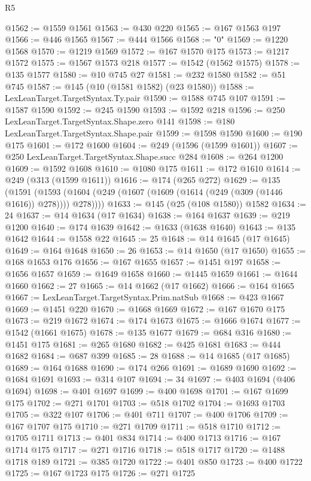 \begin{lexlean}{R5}
\begin{coremodule}
{{{{{{{{{{{{{{{{{{{{{{{{{{{{{{{{{{{{{{{{{{{{{{{{{{{{{{{{{{{{{{@1562 := @1559 @1561
@1563 := @430 @220
@1565 := @167 @1563 @197
@1566 := @446 @1565
@1567 := @444 @1566
@1568 := "0"
@1569 := @1220 @1568
@1570 := @1219 @1569
@1572 := @167 @1570 @175
@1573 := @1217 @1572
@1575 := @1567 @1573 @218
@1577 := @1542 (@1562 @1575)
@1578 := @135 @1577
@1580 := @10 @745 @27
@1581 := @232 @1580
@1582 := @51 @745
@1587 := @145 (@10 (@1581 @1582) (@23 @1580))
@1588 := LexLeanTarget.TargetSyntax.Ty.pair
@1590 := @1588 @745 @107
@1591 := @1587 @1590
@1592 := @245 @1590
@1593 := @1592 @218
@1596 := @250 LexLeanTarget.TargetSyntax.Shape.zero @141
@1598 := @180 LexLeanTarget.TargetSyntax.Shape.pair
@1599 := @1598 @1590
@1600 := @190 @175
@1601 := @172 @1600
@1604 := @249 (@1596 (@1599 @1601))
@1607 := @250 LexLeanTarget.TargetSyntax.Shape.succ @284
@1608 := @264 @1200
@1609 := @1592 @1608
@1610 := @1080 @175
@1611 := @172 @1610
@1614 := @249 (@313 (@1599 @1611))
@1616 := @174 (@265 @272)
@1629 := @135
    (@1591 (@1593 (@1604 (@249 (@1607 (@1609 (@1614 (@249 (@309 (@1446 @1616)) @278)))) @278))))
@1633 := @145 (@25 (@108 @1580)) @1582
@1634 := 24
@1637 := @14 @1634 (@17 @1634)
@1638 := @164 @1637
@1639 := @219 @1200
@1640 := @174 @1639
@1642 := @1633 (@1638 @1640)
@1643 := @135 @1642
@1644 := @1558 @22
@1645 := 25
@1648 := @14 @1645 (@17 @1645)
@1649 := @164 @1648
@1650 := 26
@1653 := @14 @1650 (@17 @1650)
@1655 := @168 @1653 @176
@1656 := @167 @1655
@1657 := @1451 @197
@1658 := @1656 @1657
@1659 := @1649 @1658
@1660 := @1445 @1659
@1661 := @1644 @1660
@1662 := 27
@1665 := @14 @1662 (@17 @1662)
@1666 := @164 @1665
@1667 := LexLeanTarget.TargetSyntax.Prim.natSub
@1668 := @423 @1667
@1669 := @1451 @220
@1670 := @1668 @1669
@1672 := @167 @1670 @175
@1673 := @219 @1672
@1674 := @174 @1673
@1675 := @1666 @1674
@1677 := @1542 (@1661 @1675)
@1678 := @135 @1677
@1679 := @684 @316
@1680 := @1451 @175
@1681 := @265 @1680
@1682 := @425 @1681
@1683 := @444 @1682
@1684 := @687 @399
@1685 := 28
@1688 := @14 @1685 (@17 @1685)
@1689 := @164 @1688
@1690 := @174 @266
@1691 := @1689 @1690
@1692 := @1684 @1691
@1693 := @314 @107
@1694 := 34
@1697 := @403 @1694 (@406 @1694)
@1698 := @401 @1697
@1699 := @400 @1698
@1701 := @167 @1699 @175
@1702 := @271 @1701
@1703 := @518 @1702
@1704 := @1693 @1703
@1705 := @322 @107
@1706 := @401 @711
@1707 := @400 @1706
@1709 := @167 @1707 @175
@1710 := @271 @1709
@1711 := @518 @1710
@1712 := @1705 @1711
@1713 := @401 @834
@1714 := @400 @1713
@1716 := @167 @1714 @175
@1717 := @271 @1716
@1718 := @518 @1717
@1720 := @1488 @1718 @189
@1721 := @385 @1720
@1722 := @401 @850
@1723 := @400 @1722
@1725 := @167 @1723 @175
@1726 := @271 @1725
}}}}}}}}}}}}}}}}}}}}}}}}}}}}}}}}}}}}}}}}}}}}}}}}}}}}}}}}}}}}}}
\end{coremodule}
\end{lexlean}
